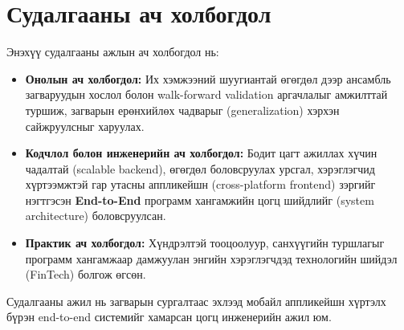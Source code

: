 \section*{Судалгааны ач холбогдол}

Энэхүү судалгааны ажлын ач холбогдол нь:

\begin{itemize}
    \item \textbf{Онолын ач холбогдол:} Их хэмжээний шуугиантай өгөгдөл дээр ансамбль загваруудын хослол болон walk-forward validation аргачлалыг амжилттай туршиж, загварын ерөнхийлөх чадварыг (generalization) хэрхэн сайжруулсныг харуулах.
    \item \textbf{Кодчлол болон инженерийн ач холбогдол:} Бодит цагт ажиллах хүчин чадалтай (scalable backend), өгөгдөл боловсруулах урсгал, хэрэглэгчид хүртээмжтэй гар утасны аппликейшн (cross-platform frontend) зэргийг нэгтгэсэн \textbf{End-to-End} программ хангамжийн цогц шийдлийг (system architecture) боловсруулсан. 
    \item \textbf{Практик ач холбогдол:} Хүндрэлтэй тооцоолуур, санхүүгийн туршлагыг программ хангамжаар дамжуулан энгийн хэрэглэгчдэд технологийн шийдэл (FinTech) болгож өгсөн.
\end{itemize}

Судалгааны ажил нь загварын сургалтаас эхлээд мобайл аппликейшн хүртэлх бүрэн end-to-end системийг хамарсан цогц инженерийн ажил юм.
